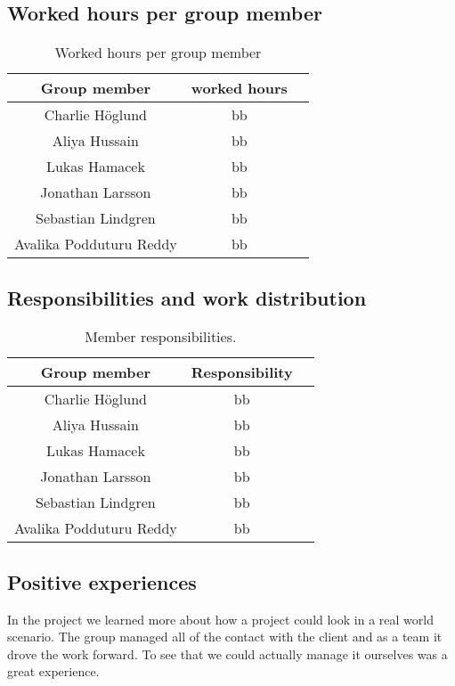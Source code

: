 \documentclass[]{article}
\begin{document}
\subsection{Worked hours per group member}

\begin{table}[h!]
	\centering
	\label{tab:table1}
	\begin{tabular}{ccc}
		\toprule
		Group member & worked hours \\
		\midrule
		Charlie Höglund & bb \\
		Aliya Hussain & bb \\
		Lukas Hamacek & bb \\
		Jonathan Larsson & bb \\
		Sebastian Lindgren & bb \\
		Avalika Podduturu Reddy & bb \\
		\bottomrule
	\end{tabular}
	\caption{Worked hours per group member}
\end{table}

\subsection{Responsibilities and work distribution}

\begin{table}[h!]
	\centering
	\label{tab:table1}
	\begin{tabular}{ccc}
		\toprule
		Group member & Responsibility \\
		\midrule
		Charlie Höglund & bb \\
		Aliya Hussain & bb \\
		Lukas Hamacek & bb \\
		Jonathan Larsson & bb \\
		Sebastian Lindgren & bb \\
		Avalika Podduturu Reddy & bb \\
		\bottomrule
	\end{tabular}
	\caption{Member responsibilities.}
\end{table}

\subsection{Positive experiences}
In the project we learned more about how a project could look in a real world scenario. The group managed all of the contact with the client and as a team it drove the work forward. To see that we could actually manage it ourselves was a great experience.
\end{document}
